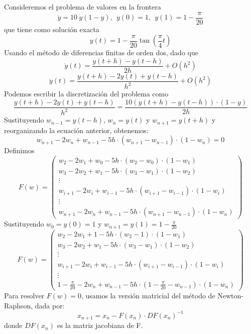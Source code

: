 \documentclass[spanish]{article}
\begin{document}
Consideremos el problema de valores en la frontera
$$
\ddot{y} = 10 \ \dot{y} (1-y), \ \ y(0) = 1,  \ \ y(1) = 1 - \frac{\pi}{20}
$$
que tiene como solución exacta
$$
y(t) = 1 - \frac{\pi}{20} \tan \left( \frac{\pi}{4} t \right)
$$
Usando el método de diferencias finitas de orden dos, dado que
$$
\dot{y}(t) = \frac{y(t+h)-y(t-h)}{2h} + O(h^2)
$$
$$
\ddot{y}(t) = \frac{y(t+h)-2y(t)+y(t-h)}{h^2} + O(h^2)
$$
Podemos escribir la discretización del problema como
$$
\frac{y(t+h)-2y(t)+y(t-h)}{h^2} = \frac{10(y(t+h)-y(t-h)) \cdot (1-y)}{2h} 
$$
Sustituyendo $w_{n-1} = y(t-h)$, $w_{n} = y(t)$ y $w_{n+1} = y(t+h)$ y reorganizando la ecuación anterior, obtenemos:
$$
w_{n+1}-2w_{n}+w_{n-1} - 5h \cdot (w_{n+1} - w_{n-1}) \cdot (1-w_{n}) = 0
$$
Definimos
$$
F(w) = 
\begin{pmatrix}
w_{2}-2w_{1}+w_{0} - 5h \cdot (w_{2} - w_{0}) \cdot (1-w_{1}) \\
w_{3}-2w_{2}+w_{1} - 5h \cdot (w_{3} - w_{1}) \cdot (1-w_{2})\\
\vdots \\
w_{i+1}-2w_{i}+w_{i-1} - 5h \cdot (w_{i+1} - w_{i-1}) \cdot (1-w_{i}) \\
\vdots \\
w_{n+1}-2w_{n}+w_{n-1} - 5h \cdot (w_{n+1} - w_{n-1}) \cdot (1-w_{n})
\end{pmatrix}
$$
Sustituyendo $w_0 = y(0) = 1 $ y $w_{n+1} = y(1) = 1 - \frac{\pi}{20}$
$$
F(w) = 
\begin{pmatrix}
w_{2}-2w_{1}+1 - 5h \cdot (w_{2} - 1) \cdot (1-w_{1}) \\
w_{3}-2w_{2}+w_{1} - 5h \cdot (w_{3} - w_{1}) \cdot (1-w_{2})\\
\vdots \\
w_{i+1}-2w_{i}+w_{i-1} - 5h \cdot (w_{i+1} - w_{i-1}) \cdot (1-w_{i}) \\
\vdots \\
1 - \frac{\pi}{20}-2w_{n}+w_{n-1} - 5h \cdot (1 - \frac{\pi}{20} - w_{n-1}) \cdot (1-w_{n})
\end{pmatrix}
$$
Para resolver $F(w) = 0$, usamos la versión matricial del método de Newton-Raphson, dada por:
$$
x_{n+1} = x_n - F(x_n) \cdot DF(x_n)^{-1}
$$
donde $DF(x_n)$ es la matriz jacobiana de F.
\end{document}
